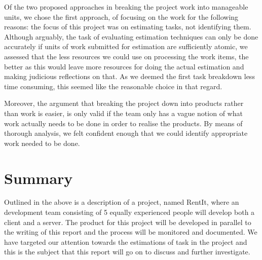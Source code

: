 Of the two proposed approaches in breaking the project work into manageable units, we chose the first approach, of focusing on the work for the following reasons: the focus of this project was on estimating tasks, not identifying them. Although arguably, the task of evaluating estimation techniques can only be done accurately if units of work submitted for estimation are sufficiently atomic, we assessed that the less resources we could use on processing the work items, the better as this would leave more resources for doing the actual estimation and making judicious reflections on that. As we deemed the first task breakdown less time consuming, this seemed like the reasonable choice in that regard.

Moreover, the argument that breaking the project down into products rather than work is easier, is only valid if the team only has a vague notion of what work actually needs to be done in order to realise the products. By means of thorough analysis, we felt confident enough that we could identify appropriate work needed to be done.


\section{Summary}
Outlined in the above is a description of a project, named RentIt, where an development team consisting of 5 equally experienced people will develop both a client and a server. The product for this project will be developed in parallel to the writing of this report and the process will be monitored and documented. We have targeted our attention towards the estimations of task in the project and this is the subject that this report will go on to discuss and further investigate. 

